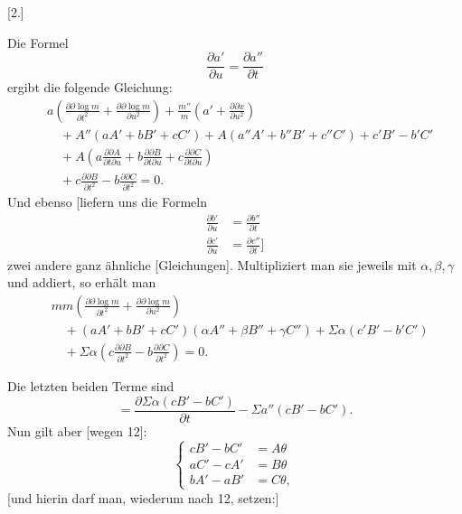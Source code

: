 %
\begin{center}[2.]\end{center}
\noindent\hspace*{1.2em} Die Formel
\[
\frac{\partial a'}{\partial u}=\frac{\partial a''}{\partial t}
\]
ergibt die folgende Gleichung:
\[
\begin{aligned}
&a\left(\frac{\partial\partial\log m}{\partial t^2}+\frac{\partial\partial\log m}{\partial u^2}\right)+\frac{m''}m\left(a'+\frac{\partial\partial x}{\partial u^2}\right)\\
&\quad+A''(aA'+bB'+cC')+A(a''A'+b''B'+c''C')+c'B'-b'C'\\
&\quad+A\left(a\frac{\partial\partial A}{\partial t\partial u}+b\frac{\partial\partial B}{\partial t\partial u}+c\frac{\partial\partial C}{\partial t\partial u}\right)\\
&\quad+c\frac{\partial\partial B}{\partial t^2}-b\frac{\partial\partial C}{\partial t^2}=0.
\end{aligned}
\]
Und ebenso [liefern uns die Formeln
\[
\begin{aligned}
\frac{\partial b'}{\partial u}&=\frac{\partial b''}{\partial t}\\
\frac{\partial c'}{\partial u}&=\frac{\partial c''}{\partial t}]
\end{aligned}
\]
zwei andere ganz ähnliche [Gleichungen]. Multipliziert man sie jeweils mit $\alpha,\beta,\gamma$ und addiert, so erhält man
\[
\begin{aligned}
&mm\left(\frac{\partial\partial\log m}{\partial t^2}+\frac{\partial\partial\log m}{\partial u^2}\right)\\
&\quad+(aA'+bB'+cC')(\alpha A''+\beta B''+\gamma C'')+\Sigma\alpha(c'B'-b'C')\\
&\quad+\Sigma\alpha\left(c\frac{\partial\partial B}{\partial t^2}-b\frac{\partial\partial C}{\partial t^2}\right)=0.
\end{aligned}
\]
\par\indent Die letzten beiden Terme sind
\[
=\frac{\partial\Sigma\alpha(cB'-bC')}{\partial t}-\Sigma a''(cB'-bC').
\]
Nun gilt aber [wegen 12]:
\begin{equation}\tag*{[23]}
\left\{\begin{aligned}
cB'-bC'&=A\theta\\
aC'-cA'&=B\theta\\
bA'-aB'&=C\theta,
\end{aligned}\right.
\end{equation}
[und hierin darf man, wiederum nach 12, setzen:]

